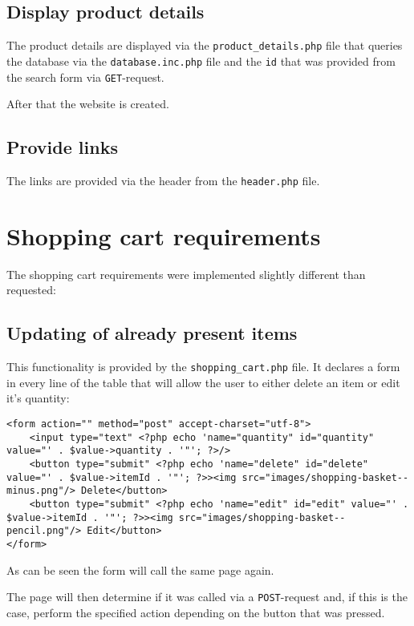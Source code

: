\subsection{Display product details}

The product details are displayed via the \texttt{product\_details.php} file that queries the database via the \texttt{database.inc.php} file and the \texttt{id} that was provided from the search form via \texttt{GET}-request.

After that the website is created.

\subsection{Provide links}

The links are provided via the header from the \texttt{header.php} file.

\section{Shopping cart requirements}

The shopping cart requirements were implemented slightly different than requested:

\subsection{Updating of already present items}

This functionality is provided by the \texttt{shopping\_cart.php} file.
It declares a form in every line of the table that will allow the user to either delete an item or edit it's quantity:

\begin{lstlisting}[caption=Shopping cart form for editing an existing item.]
<form action="" method="post" accept-charset="utf-8">
	<input type="text" <?php echo 'name="quantity" id="quantity" value="' . $value->quantity . '"'; ?>/>
	<button type="submit" <?php echo 'name="delete" id="delete" value="' . $value->itemId . '"'; ?>><img src="images/shopping-basket--minus.png"/> Delete</button>
	<button type="submit" <?php echo 'name="edit" id="edit" value="' . $value->itemId . '"'; ?>><img src="images/shopping-basket--pencil.png"/> Edit</button>
</form>
\end{lstlisting}
As can be seen the form will call the same page again.

The page will then determine if it was called via a \texttt{POST}-request and, if this is the case, perform the specified action depending on the button that was pressed.

